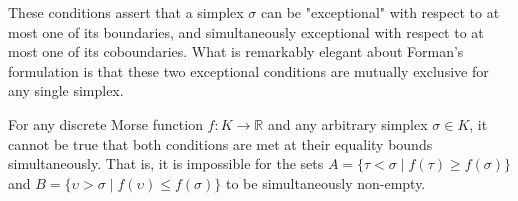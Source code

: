 These conditions assert that a simplex $\sigma$ can be "exceptional" with respect to at most one of its boundaries, and simultaneously exceptional with respect to at most one of its coboundaries. What is remarkably elegant about Forman's formulation is that these two exceptional conditions are mutually exclusive for any single simplex.

\begin{lemma}
\label{lem:mutually_exclusive}
For any discrete Morse function $f : K \to \mathbb{R}$ and any arbitrary simplex $\sigma \in K$, it cannot be true that both conditions are met at their equality bounds simultaneously. That is, it is impossible for the sets $A = \{ \tau < \sigma \mid f(\tau) \ge f(\sigma) \}$ and $B = \{ \upsilon > \sigma \mid f(\upsilon) \le f(\sigma) \}$ to be simultaneously non-empty.
\end{lemma}

